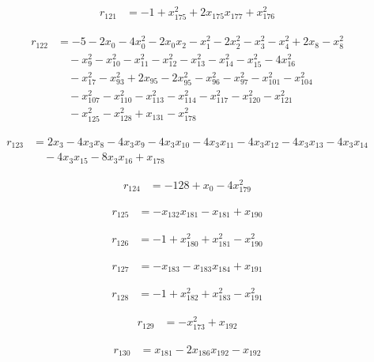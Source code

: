 \begin{align*}
r_{121}&=-1+x_{175}^{2}+2x_{175}x_{177}+x_{176}^{2}
\end{align*}

\begin{align*}
r_{122}&=-5-2x_{0}-4x_{0}^{2}-2x_{0}x_{2}-x_{1}^{2}-2x_{2}^{2}-x_{3}^{2}-x_{4}^{2}+2x_{8}-x_{8}^{2}\\
&\quad -x_{9}^{2}-x_{10}^{2}-x_{11}^{2}-x_{12}^{2}-x_{13}^{2}-x_{14}^{2}-x_{15}^{2}-4x_{16}^{2}\\
&\quad -x_{17}^{2}-x_{93}^{2}+2x_{95}-2x_{95}^{2}-x_{96}^{2}-x_{97}^{2}-x_{101}^{2}-x_{104}^{2}\\
&\quad -x_{107}^{2}-x_{110}^{2}-x_{113}^{2}-x_{114}^{2}-x_{117}^{2}-x_{120}^{2}-x_{121}^{2}\\
&\quad -x_{125}^{2}-x_{128}^{2}+x_{131}-x_{178}^{2}
\end{align*}

\begin{align*}
r_{123}&=2x_{3}-4x_{3}x_{8}-4x_{3}x_{9}-4x_{3}x_{10}-4x_{3}x_{11}-4x_{3}x_{12}-4x_{3}x_{13}-4x_{3}x_{14}\\
&\quad -4x_{3}x_{15}-8x_{3}x_{16}+x_{178}
\end{align*}

\begin{align*}
r_{124}&=-128+x_{0}-4x_{179}^{2}
\end{align*}

\begin{align*}
r_{125}&=-x_{132}x_{181}-x_{181}+x_{190}
\end{align*}

\begin{align*}
r_{126}&=-1+x_{180}^{2}+x_{181}^{2}-x_{190}^{2}
\end{align*}

\begin{align*}
r_{127}&=-x_{183}-x_{183}x_{184}+x_{191}
\end{align*}

\begin{align*}
r_{128}&=-1+x_{182}^{2}+x_{183}^{2}-x_{191}^{2}
\end{align*}

\begin{align*}
r_{129}&=-x_{173}^{2}+x_{192}
\end{align*}

\begin{align*}
r_{130}&=x_{181}-2x_{186}x_{192}-x_{192}
\end{align*}

